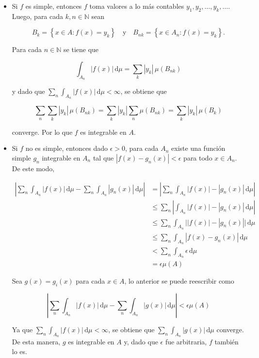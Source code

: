\documentclass[fleqn]{article}
\begin{document}
	\begin{itemize}
		\item Si $f$ es simple, entonces $f$ toma valores a lo más contables $ y_1, y_2, \ldots, y_k, \ldots $. Luego, para cada $ k, n \in \mathbb{N} $ sean 
		
		\begin{equation*}
			B_k = \left\lbrace x \in A \colon f(x) = y_k \right\rbrace \quad \mbox{y} \quad B_{nk} = \left\lbrace x \in A_n \colon f(x) = y_k \right\rbrace.
		\end{equation*}

		Para cada $ n \in \mathbb{N} $ se tiene que 

		\begin{equation*}
			\int_{A_n} | f(x) | \, \mathrm{d} \mu = \sum_{k} | y_k | \, \mu (B_{nk})
		\end{equation*}

		y dado que $ \displaystyle \sum_{n} \int_{A_n} | f(x) | \, \mathrm{d} \mu < \infty $, se obtiene que

		\begin{equation*}
			\sum_{n} \sum_{k} | y_k | \, \mu (B_{nk}) = \sum_{k} | y_k | \sum_{n} \mu (B_{nk}) = \sum_{k} | y_k | \, \mu (B_k)
		\end{equation*}

		converge. Por lo que $f$ es integrable en $A$.

		\item Si $f$ no es simple, entonces dado $ \epsilon > 0 $, para cada $ A_n $ existe una función simple $ g_n $ integrable en $ A_n $ tal que $ | f(x) - g_n(x) | < \epsilon $ para todo $ x \in A_n $. De este modo,
		
		\begin{align*}
			\left| \sum_{n} \int_{A_n} |f(x)| \, \mathrm{d} \mu - \sum_{n} \int_{A_n} |g_n(x)| \, \mathrm{d} \mu \right| &= \left| \sum_{n} \int_{A_n} |f(x)| - |g_n(x)| \, \mathrm{d} \mu \right| \\
			&\leq \sum_{n} \left| \int_{A_n} |f(x)| - |g_n(x)| \, \mathrm{d} \mu \right| \\
			&\leq \sum_{n} \int_{A_n} \bigl| |f(x)| - |g_n(x)| \bigr| \, \mathrm{d} \mu \\
			&\leq \sum_{n} \int_{A_n} | f(x) - g_n(x) | \, \mathrm{d} \mu \\
			&< \sum_{n} \int_{A_n} \epsilon \, \mathrm{d} \mu \\
			&= \epsilon \mu (A)
		\end{align*}
		
		Sea $ g(x) = g_i(x) $ para cada $ x \in A $, lo anterior se puede reescribir como

		\begin{equation*}
			\left| \sum_{n} \int_{A_n} |f(x)| \, \mathrm{d} \mu - \sum_{n} \int_{A_n} |g(x)| \, \mathrm{d} \mu \right| < \epsilon \mu (A)
		\end{equation*}

		Ya que $ \displaystyle \sum_{n} \int_{A_n} | f(x) | \, \mathrm{d} \mu < \infty $, se obtiene que $ \displaystyle \sum_{n} \int_{A_n} |g(x)| \, \mathrm{d} \mu $ converge. De esta manera, $g$ es integrable en $A$ y, dado que $ \epsilon $ fue arbitraria, $ f $ también lo es.
	\end{itemize}
\end{document}
